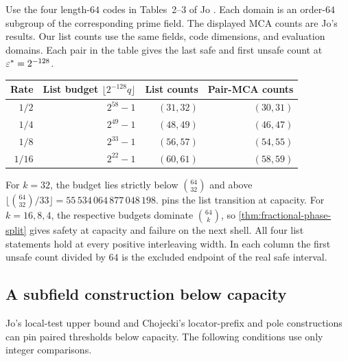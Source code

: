 Use the four length-\(64\) codes in Tables~2--3 of Jo
\cite[Section~5.2]{jo2026beyondJohnson}. Each domain is an order-\(64\)
subgroup of the corresponding prime field. The displayed MCA counts are
Jo's results. Our list counts use the same fields, code dimensions, and
evaluation domains. Each pair in the table gives the last safe and first
unsafe count at \(\varepsilon^\ast=2^{-128}\).

\begin{center}
\begin{tabular}{@{}rrrr@{}}
\toprule
Rate & List budget \(\lfloor 2^{-128}q\rfloor\) & List counts & Pair-MCA counts\\
\midrule
\(1/2\)  & \(2^{58}-1\) & \((31,32)\) & \((30,31)\)\\
\(1/4\)  & \(2^{49}-1\) & \((48,49)\) & \((46,47)\)\\
\(1/8\)  & \(2^{33}-1\) & \((56,57)\) & \((54,55)\)\\
\(1/16\) & \(2^{22}-1\) & \((60,61)\) & \((58,59)\)\\
\bottomrule
\end{tabular}
\end{center}

For \(k=32\), the budget lies strictly below \(\binom{64}{32}\) and
above \(\lfloor\binom{64}{32}/33\rfloor=55\,534\,064\,877\,048\,198\).
 pins the list transition at capacity.
For \(k=16,8,4\), the respective budgets dominate \(\binom{64}{k}\),
so \cref{thm:fractional-phase-split} gives safety at capacity and failure
on the next shell. All four list statements hold at every positive
interleaving width. In each column the first unsafe count divided by
\(64\) is the excluded endpoint of the real safe interval.

\subsection{A subfield construction below capacity}
\label{sec:subfield-crossings}

Jo's local-test upper bound \cite[Theorem~4.2]{jo2026beyondJohnson} and
Chojecki's locator-prefix and pole constructions
\cite[Section~4]{chojecki2026thresholds} can pin paired thresholds below
capacity. The following conditions use only integer comparisons.

